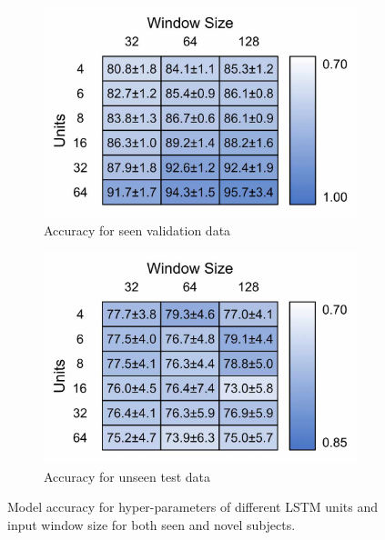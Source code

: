 \begin{figure}[!hbt]
    \centering
    \begin{subfigure}{.4\linewidth}
        \centering
        \includegraphics[width=\textwidth]{content/4-LSTM_Behaviour/results/window_v_units_train.jpg}
	 \caption{Accuracy for seen validation data}
        \label{fig:model_size_hyper_param_train}
    \end{subfigure}
    \begin{subfigure}{.4\linewidth}
        \centering
        \includegraphics[width=\textwidth]{content/4-LSTM_Behaviour/results/window_v_units_test.jpg}
        \caption{Accuracy for unseen test data}
        \label{fig:model_size_hyper_param_test}
    \end{subfigure}
    \caption{Model accuracy for hyper-parameters of different LSTM units and input window size for both seen and novel subjects.}
\label{fig:model_size_hyper_param}
\end{figure}

